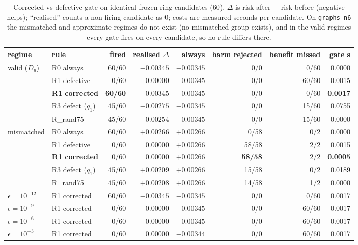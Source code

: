 \documentclass[11pt]{article}
\begin{document}
\begin{table}[t]
\centering
\caption{Corrected vs defective gate on identical frozen ring candidates ($60$).
$\Delta$ is risk after $-$ risk before (negative helps); ``realised'' counts a non-firing
candidate as $0$; costs are measured seconds per candidate. On \texttt{graphs\_n6} the
mismatched and approximate regimes do not exist (no mismatched group exists), and in the valid
regimes every gate fires on every candidate, so no rule differs there.}
\label{tab:corrected}
\small
\begin{tabular}{@{}llrrrrrr@{}}
\toprule
regime & rule & fired & realised $\Delta$ & always & harm rejected & benefit missed & gate s \\
\midrule
valid ($D_6$) & R0 always            & 60/60 & $-0.00345$ & $-0.00345$ & 0/0   & 0/60   & 0.0000 \\
              & R1 defective         & 0/60  & $0.00000$  & $-0.00345$ & 0/0   & 60/60  & 0.0015 \\
              & \textbf{R1 corrected} & \textbf{60/60} & $\mathbf{-0.00345}$ & $-0.00345$ & 0/0 & 0/60 & \textbf{0.0017} \\
              & R3 defect ($q_1$)    & 45/60 & $-0.00275$ & $-0.00345$ & 0/0   & 15/60  & 0.0755 \\
              & R\_rand75            & 45/60 & $-0.00254$ & $-0.00345$ & 0/0   & 15/60  & 0.0000 \\
\midrule
mismatched    & R0 always            & 60/60 & $+0.00266$ & $+0.00266$ & 0/58  & 0/2    & 0.0000 \\
              & R1 defective         & 0/60  & $0.00000$  & $+0.00266$ & 58/58 & 2/2    & 0.0015 \\
              & \textbf{R1 corrected} & 0/60 & $\mathbf{0.00000}$ & $+0.00266$ & \textbf{58/58} & 2/2 & \textbf{0.0005} \\
              & R3 defect ($q_1$)    & 45/60 & $+0.00209$ & $+0.00266$ & 15/58 & 0/2    & 0.0189 \\
              & R\_rand75            & 45/60 & $+0.00208$ & $+0.00266$ & 14/58 & 1/2    & 0.0000 \\
\midrule
$\epsilon{=}10^{-12}$ & R1 corrected   & 60/60 & $-0.00345$ & $-0.00345$ & 0/0 & 0/60 & 0.0017 \\
$\epsilon{=}10^{-9}$  & R1 corrected   & 0/60  & $0.00000$  & $-0.00345$ & 0/0 & 60/60 & 0.0017 \\
$\epsilon{=}10^{-6}$  & R1 corrected   & 0/60  & $0.00000$  & $-0.00345$ & 0/0 & 60/60 & 0.0017 \\
$\epsilon{=}10^{-3}$  & R1 corrected   & 0/60  & $0.00000$  & $-0.00344$ & 0/0 & 60/60 & 0.0017 \\
\bottomrule
\end{tabular}
\end{table}
\end{document}
